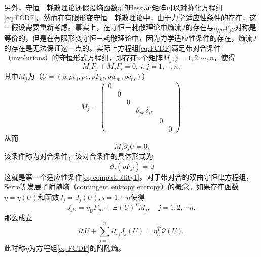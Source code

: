 
另外，守恒－耗散理论还假设熵函数$\eta$的Hessian矩阵可以对称化方程组\eqref{eq:FCDF}。然而在有限形变守恒－耗散理论中，由于力学适应性条件的存在，这一假设需要重新考虑。事实上，在守恒－耗散理论中熵流$J$的存在与$\eta_{UU}F_{jU}$对称是等价的，但是在有限形变守恒－耗散理论中，因为力学适应性条件的存在，熵流$J$的存在是无法保证这一点的。实际上方程组\eqref{eq:FCDF}满足带对合条件（involutions）的守恒形式方程组\cite{dafermos1986quasilinear,dafermos2013non,benzoni2007multi}，即存在$n$个矩阵$M_j,j=1,2,\cdots,n$，使得
\begin{equation*}
	M_i F_{j} + M_j F_i = 0, \ i,j = 1, \cdots,n ,
\end{equation*}
其中$M_j$为（$U= (\rho,\rho v_i,\rho e, \rho F_{kl},\rho w_m, \rho c_{rs})$）
\begin{equation*}
	M_{j} = \left( \begin{array}{ccccccc}
		0 \\
		& 0 \\
		& & 0 \\
		& & & \delta_{jk'}\delta_{ll'} \\
		& & & & 0 \\
		& & & & & 0
	\end{array} \right).
\end{equation*}
从而
\begin{equation}\label{eq:involutions}
	M_j \partial_j U = 0.
\end{equation}
该条件称为对合条件，该对合条件的具体形式为
\begin{equation*}
	\partial_{j} (\rho F_{jl}) = 0
\end{equation*}
这就是第一个适应性条件\eqref{eq:compatibility1}。对于带对合的双曲守恒律方程组，Serre等发展了附随熵（contingent entropy entropy）的概念\cite{benzoni2007multi}。如果存在函数$\eta = \eta(U)$和函数$J_j=J_j(U),j=1, \cdots n$使得
\begin{equation*}
	J_{jU}  = \eta_U F_{jU} + \Xi(U)^T M_j,\quad j=1,2, \cdots n,
\end{equation*}
那么成立
\begin{equation*}
	\partial_t U + \sum_{j=1}^n \partial_{x_j} J_{j}(U) = \eta_U^T \mathcal{Q}(U).
\end{equation*}
此时称$\eta$为方程组\eqref{eq:FCDF}的附随熵。

